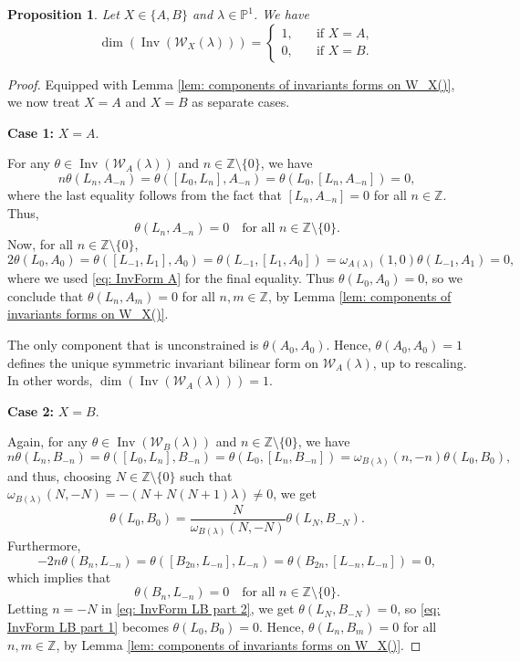 \documentclass[11pt, svgnames]{amsart}
\DeclareMathOperator{\Inv}{Inv}
\newcommand{\ZZ}{\mathbb{Z}}
\newcommand{\PP}{\mathbb{P}}
\newcommand{\W}{\mathcal{W}}
\newcommand{\nonzero}{\setminus \{0\}}
\newcommand{\case}[2]{\vspace{2mm} \textbf{Case #1:} #2 \vspace{2mm}}
\newtheorem{proposition}{Proposition}[section]
\theoremstyle{definition}
\begin{document}
\begin{proposition}\label{prop:InvForm}
Let $X \in \{A,B\}$ and $\lambda \in \PP^1$. We have
    $$\dim(\Inv(\W_X(\lambda)))=\begin{cases}
        1, \quad &\text{if } X = A, \\
        0, \quad &\text{if } X = B.
    \end{cases}$$
\end{proposition}
\begin{proof}
    Equipped with Lemma \ref{lem: components of invariants forms on W_X()}, we now treat $X = A$ and $X = B$ as separate cases.
    
    \case{1}{$X = A$.}
    
    For any $\theta \in \Inv(\W_A(\lambda))$ and $n \in \ZZ \nonzero$, we have
    $$n\theta(L_n, A_{-n}) = \theta([L_0, L_{n}], A_{-n}) = \theta(L_{0}, [L_n,A_{-n}]) = 0,$$
    where the last equality follows from the fact that $[L_n, A_{-n}] = 0$ for all $n \in \ZZ$. Thus,
    \begin{equation}\label{eq: InvForm A}
        \theta(L_n, A_{-n}) = 0 \quad \text{for all } n \in \ZZ \nonzero.
    \end{equation}
    Now, for all $n \in \ZZ\nonzero$,
    $$2\theta(L_0, A_0) = \theta([L_{-1}, L_1], A_{0}) = \theta(L_{-1}, [L_1,A_{0}]) = \omega_{A(\lambda)}(1,0) \theta(L_{-1}, A_1) = 0,$$
    where we used \eqref{eq: InvForm A} for the final equality. Thus $\theta(L_0,A_0) = 0$, so we conclude that $\theta(L_n, A_m) = 0$ for all $n,m \in \ZZ$, by Lemma \ref{lem: components of invariants forms on W_X()}.
    
    The only component that is unconstrained is $\theta(A_0, A_0)$. Hence, $\theta(A_0, A_0) = 1$ defines the unique symmetric invariant bilinear form on $\W_A (\lambda)$, up to rescaling. In other words, $\dim(\Inv(\W_A(\lambda))) = 1$.

    \case{2}{$X = B$.}
    
    Again, for any $\theta \in \Inv(\W_B(\lambda))$ and $n \in \ZZ \nonzero$, we have
    $$n\theta(L_n, B_{-n}) = \theta([L_0, L_{n}], B_{-n}) = \theta(L_{0}, [L_n,B_{-n}]) = \omega_{B(\lambda)}(n,-n)\theta(L_0,B_0),$$
    and thus, choosing $N \in \ZZ \nonzero$ such that $\omega_{B(\lambda)}(N,-N) = -(N + N(N + 1)\lambda) \neq 0$, we get
    \begin{equation}\label{eq: InvForm LB part 1}
        \theta(L_0, B_0) = \frac{N}{\omega_{B(\lambda)}(N,-N)} \theta(L_N, B_{-N}).
    \end{equation}
    Furthermore,
    $$-2n\theta(B_n, L_{-n}) = \theta([B_{2n},L_{-n}], L_{-n}) = \theta(B_{2n},[L_{-n},L_{-n}]) = 0,$$
    which implies that
    \begin{equation}\label{eq: InvForm LB part 2}
         \theta(B_n, L_{-n}) = 0 \quad \text{for all } n \in \ZZ \nonzero.
    \end{equation}
    Letting $n = -N$ in \eqref{eq: InvForm LB part 2}, we get $\theta(L_N, B_{-N}) = 0$, so \eqref{eq: InvForm LB part 1} becomes $\theta(L_0,B_0) = 0$. Hence, $\theta(L_n, B_m) = 0$ for all $n,m \in \ZZ$, by Lemma \ref{lem: components of invariants forms on W_X()}.
    

\end{proof}
\end{document}
